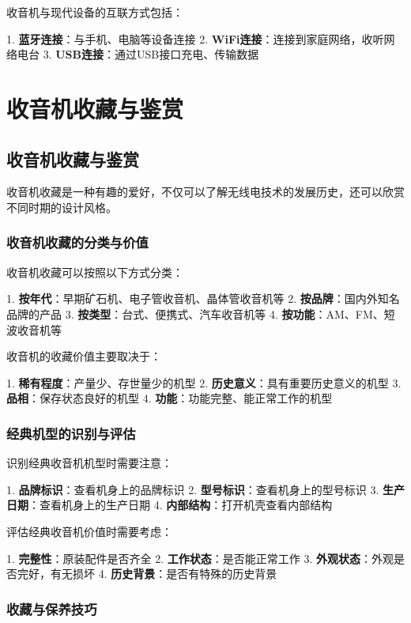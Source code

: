 \documentclass[12pt,UTF8]{ctexbook}
\begin{document}
收音机与现代设备的互联方式包括：

1. \textbf{蓝牙连接}：与手机、电脑等设备连接
2. \textbf{WiFi连接}：连接到家庭网络，收听网络电台
3. \textbf{USB连接}：通过USB接口充电、传输数据
\part{收音机收藏与鉴赏}

\chapter{收音机收藏与鉴赏}

收音机收藏是一种有趣的爱好，不仅可以了解无线电技术的发展历史，还可以欣赏不同时期的设计风格。

\section{收音机收藏的分类与价值}

收音机收藏可以按照以下方式分类：

1. \textbf{按年代}：早期矿石机、电子管收音机、晶体管收音机等
2. \textbf{按品牌}：国内外知名品牌的产品
3. \textbf{按类型}：台式、便携式、汽车收音机等
4. \textbf{按功能}：AM、FM、短波收音机等

收音机的收藏价值主要取决于：

1. \textbf{稀有程度}：产量少、存世量少的机型
2. \textbf{历史意义}：具有重要历史意义的机型
3. \textbf{品相}：保存状态良好的机型
4. \textbf{功能}：功能完整、能正常工作的机型

\section{经典机型的识别与评估}

识别经典收音机机型时需要注意：

1. \textbf{品牌标识}：查看机身上的品牌标识
2. \textbf{型号标识}：查看机身上的型号标识
3. \textbf{生产日期}：查看机身上的生产日期
4. \textbf{内部结构}：打开机壳查看内部结构

评估经典收音机价值时需要考虑：

1. \textbf{完整性}：原装配件是否齐全
2. \textbf{工作状态}：是否能正常工作
3. \textbf{外观状态}：外观是否完好，有无损坏
4. \textbf{历史背景}：是否有特殊的历史背景

\section{收藏与保养技巧}
\end{document}
